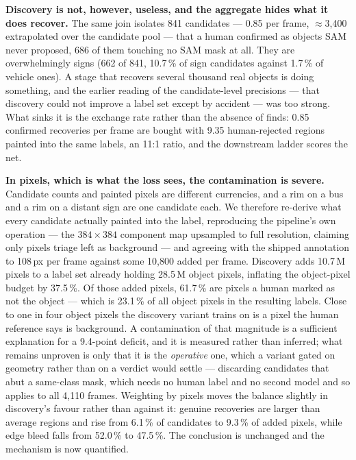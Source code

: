 \documentclass[conference]{IEEEtran}
\begin{document}
\textbf{Discovery is not, however, useless, and the aggregate hides what it does recover.}
The same join isolates 841 candidates --- 0.85 per frame, $\approx$3{,}400 extrapolated over the
candidate pool --- that a human confirmed as objects SAM never proposed, 686 of them touching no SAM
mask at all. They are overwhelmingly signs (662 of 841, 10.7\,\% of sign candidates against 1.7\,\% of
vehicle ones). A stage that recovers several thousand real objects is doing something, and the earlier
reading of the candidate-level precisions --- that discovery could not improve a label set except by
accident --- was too strong. What sinks it is the exchange rate rather than the absence of finds: 0.85
confirmed recoveries per frame are bought with 9.35 human-rejected regions painted into the same
labels, an 11:1 ratio, and the downstream ladder scores the net.

\textbf{In pixels, which is what the loss sees, the contamination is severe.}
Candidate counts and painted pixels are different currencies, and a rim on a bus and a rim on a distant
sign are one candidate each. We therefore re-derive what every candidate actually painted into the
label, reproducing the pipeline's own operation --- the $384{\times}384$ component map upsampled to full
resolution, claiming only pixels triage left as background --- and agreeing with the shipped annotation
to 108\,px per frame against some 10{,}800 added per frame.
Discovery adds 10.7\,M pixels to a label set already holding 28.5\,M object pixels, inflating the
object-pixel budget by 37.5\,\%. Of those added pixels, 61.7\,\% are pixels a human marked as not the
object --- which is 23.1\,\% of all object pixels in the resulting labels. Close to one in four object
pixels the discovery variant trains on is a pixel the human reference says is background.
A contamination of that magnitude is a sufficient explanation for a 9.4-point deficit, and it is
measured rather than inferred; what remains unproven is only that it is the \emph{operative} one, which
a variant gated on geometry rather than on a verdict would settle --- discarding candidates that abut a
same-class mask, which needs no human label and no second model and so applies to all 4{,}110 frames.
Weighting by pixels moves the balance slightly in discovery's favour rather than against it: genuine
recoveries are larger than average regions and rise from 6.1\,\% of candidates to 9.3\,\% of added
pixels, while edge bleed falls from 52.0\,\% to 47.5\,\%. The conclusion is unchanged and the mechanism
is now quantified.
\end{document}
